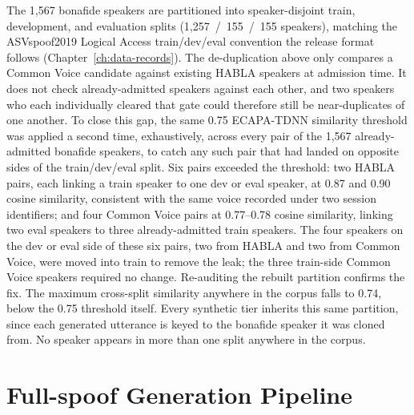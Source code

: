 \documentclass[11pt]{report}
\begin{document}
The 1{,}567 bonafide speakers are partitioned into speaker-disjoint
train, development, and evaluation splits (1{,}257~/~155~/~155 speakers),
matching the ASVspoof2019 Logical Access train/dev/eval convention the
release format follows (Chapter~\ref{ch:data-records}). The
de-duplication above only compares a Common Voice candidate against
existing HABLA speakers at admission time. It does not check
already-admitted speakers against each other, and two speakers who each
individually cleared that gate could therefore still be near-duplicates
of one another. To close this gap, the same 0.75 ECAPA-TDNN similarity
threshold was applied a second time, exhaustively, across every pair of
the 1{,}567 already-admitted bonafide speakers, to catch any such pair
that had landed on opposite sides of the train/dev/eval split. Six pairs
exceeded the threshold: two HABLA pairs, each linking a train speaker to
one dev or eval speaker, at 0.87 and 0.90 cosine similarity, consistent
with the same voice recorded under two session identifiers; and four
Common Voice pairs at 0.77--0.78 cosine similarity, linking two eval
speakers to three already-admitted train speakers. The four speakers on
the dev or eval side of these six pairs, two from HABLA and two from
Common Voice, were moved into train to remove the leak; the three
train-side Common Voice speakers required no change. Re-auditing the
rebuilt partition confirms the
fix. The maximum cross-split similarity anywhere in the corpus falls to
0.74, below the 0.75 threshold itself. Every synthetic tier inherits this
same partition, since each generated utterance is keyed to the bonafide
speaker it was cloned from. No speaker appears in more than one split
anywhere in the corpus.

\section{Full-spoof Generation Pipeline}
\label{sec:fullspoof}
\end{document}
